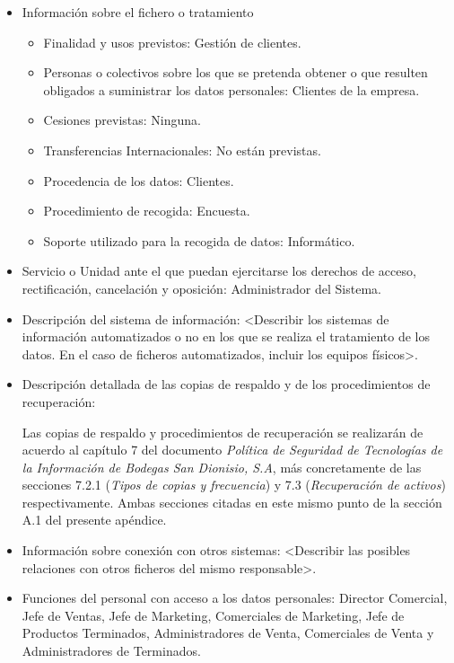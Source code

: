 \documentclass[a4paper,11pt,bibtotoc,noliststotoc]{scrbook}
\begin{document}
\begin{itemize}
\item Información sobre el fichero o tratamiento
	\begin{itemize}
	\item Finalidad y usos previstos: Gestión de clientes.
	\item Personas o colectivos sobre los que se pretenda obtener o que resulten obligados a suministrar los datos personales: Clientes de la empresa.
	\item Cesiones previstas: Ninguna.
	\item Transferencias Internacionales: No están previstas.
	\item Procedencia de los datos: Clientes.
	\item Procedimiento de recogida: Encuesta.
	\item Soporte utilizado para la recogida de datos: Informático.
	\end{itemize}

\item Servicio o Unidad ante el que puedan ejercitarse los derechos de acceso, rectificación, cancelación y oposición: Administrador del Sistema.

\item Descripción del sistema de información: <Describir los sistemas de información automatizados o no en los que se realiza el tratamiento de los datos. En el caso de ficheros automatizados, incluir los equipos físicos>.

\item Descripción detallada de las copias de respaldo y de los procedimientos de recuperación:

Las copias de respaldo y procedimientos de recuperación se realizarán de acuerdo al capítulo 7 del documento \emph{Política de Seguridad de Tecnologías de la Información de Bodegas San Dionisio, S.A}, más concretamente de las secciones 7.2.1 (\emph{Tipos de copias y frecuencia}) y 7.3 (\emph{Recuperación de activos}) respectivamente. Ambas secciones citadas en este mismo punto de la sección A.1 del presente apéndice.

\item Información sobre conexión con otros sistemas: <Describir las posibles relaciones con otros ficheros del mismo responsable>.

\item Funciones del personal con acceso a los datos personales: Director Comercial, Jefe de Ventas, Jefe de Marketing, Comerciales de Marketing, Jefe de Productos Terminados, Administradores de Venta, Comerciales de Venta y Administradores de Terminados.


\end{itemize}
\end{document}
